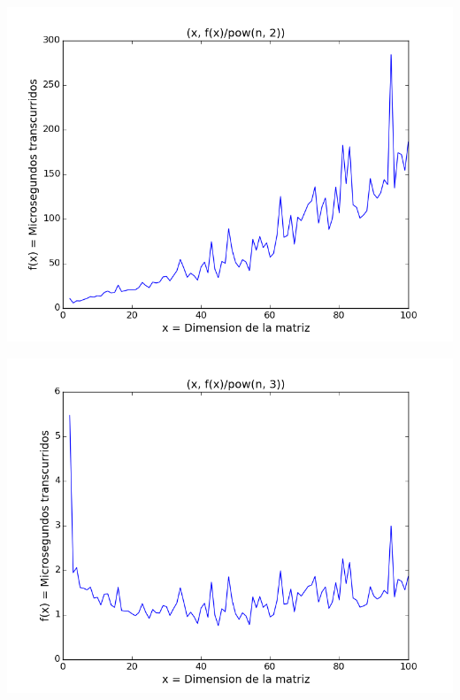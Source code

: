 \begin{center}
\includegraphics[scale=0.54]{images/4potenciasobrecuadrado}
\end{center}


\begin{center}
\includegraphics[scale=0.54]{images/4potenciasobrecubo}
\end{center}





